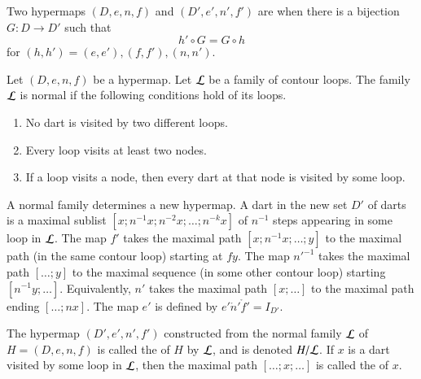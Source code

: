 \begin{definition}[isomorphism]
 Two hypermaps $(D,e,n,f)$ and
$(D',e',n',f')$ are  when there is a bijection
$G:D\to D'$ such that
\begin{displaymath}h'\circ G = G\circ h\end{displaymath}
for $(h,h')=(e,e'), (f,f'), (n,n')$.
%
%
\end{definition}


\begin{definition}
Let $(D,e,n,f)$ be a hypermap. 
Let $\cal L$ be a family of contour
loops.  The family $\cal L$ is  normal if the following
conditions hold of its loops. \begin{enumerate}
\item  No dart is visited by two different loops.
\item  Every loop visits at least two nodes.
\item  If a loop visits a node, then every dart at that node is visited
by some loop.
\end{enumerate}
%
\end{definition}

A normal family determines a new hypermap.  A dart in the new set $D'$
of darts is a maximal sublist $[x;n^{-1} x; n^{-2} x;\ldots;n^{-k}
x]$ of $n^{-1}$ steps appearing in some loop in $\cal L$. The map $f'$
takes the maximal path $[x;n^{-1}x;\ldots;y]$ to the maximal path (in
the same contour loop) starting at $f y$. The map ${n'}^{-1}$ takes
the maximal path $[\ldots;y]$ to the maximal sequence (in some other
contour loop) starting $[n^{-1}y;\ldots]$. Equivalently, $n'$ takes
the maximal path $[x;\ldots]$ to the maximal path ending $[\ldots;n
x]$. The map $e'$ is defined by $e'\ocirc n'\ocirc f' = I_{D'}$.
%

\begin{definition}[quotient]
 The hypermap $(D',e',n',f')$
constructed from the normal
family $\cal L$ of $H=(D,e,n,f)$ 
is called the  of $H$ by $\cal L$, and is denoted
$H/{\cal L}$.  If $x$ is a dart visited by some loop in $\cal L$, then
the maximal path $[\ldots;x;\ldots]$ is called the  of $x$.
%
\end{definition}
%
%
%
%

